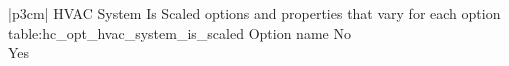 \begin{customLongTable}{ |p{3cm}| }
{HVAC System Is Scaled options and properties that vary for each option} {table:hc_opt_hvac_system_is_scaled}
{Option name}
No \\ \hline
Yes \\
\end{customLongTable}
